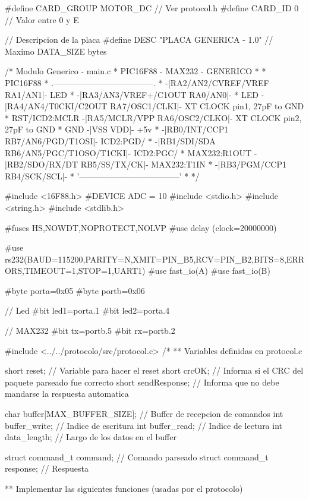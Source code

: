 \documentclass[a4paper,10pt]{article}
\begin{document}
{\scriptsize
\begin{verbatimtab}
#define CARD_GROUP	MOTOR_DC	// Ver protocol.h
#define CARD_ID		0		// Valor entre 0 y E

// Descripcion de la placa
#define DESC		"PLACA GENERICA - 1.0" // Maximo DATA_SIZE bytes

/* Modulo Generico - main.c
 * PIC16F88 - MAX232 - GENERICO
 *
 *                               PIC16F88
 *                .------------------------------------.
 *               -|RA2/AN2/CVREF/VREF           RA1/AN1|- LED
 *               -|RA3/AN3/VREF+/C1OUT          RA0/AN0|- 
 *           LED -|RA4/AN4/T0CKI/C2OUT    RA7/OSC1/CLKI|- XT CLOCK pin1, 27pF to GND
 * RST/ICD2:MCLR -|RA5/MCLR/VPP           RA6/OSC2/CLKO|- XT CLOCK pin2, 27pF to GND
 *           GND -|VSS                              VDD|- +5v
 *               -|RB0/INT/CCP1       RB7/AN6/PGD/T1OSI|- ICD2:PGD/
 *               -|RB1/SDI/SDA  RB6/AN5/PGC/T1OSO/T1CKI|- ICD2:PGC/
 *  MAX232:R1OUT -|RB2/SDO/RX/DT           RB5/SS/TX/CK|- MAX232:T1IN
 *               -|RB3/PGM/CCP1             RB4/SCK/SCL|- 
 *                '------------------------------------'
 *    
 */

#include <16F88.h>
#DEVICE ADC = 10
#include <stdio.h>
#include <string.h>
#include <stdlib.h>

#fuses HS,NOWDT,NOPROTECT,NOLVP
#use delay (clock=20000000)

#use rs232(BAUD=115200,PARITY=N,XMIT=PIN_B5,RCV=PIN_B2,BITS=8,ERRORS,TIMEOUT=1,STOP=1,UART1)
#use fast_io(A)
#use fast_io(B)

#byte porta=0x05
#byte portb=0x06

// Led
#bit led1=porta.1
#bit led2=porta.4

// MAX232
#bit tx=portb.5
#bit rx=portb.2

#include <../../protocolo/src/protocol.c>
/*
** Variables definidas en protocol.c

short reset; // Variable para hacer el reset
short crcOK; // Informa si el CRC del paquete parseado fue correcto
short sendResponse; // Informa que no debe mandarse la respuesta automatica

char buffer[MAX_BUFFER_SIZE];	// Buffer de recepcion de comandos
int buffer_write;		// Indice de escritura
int buffer_read;		// Indice de lectura
int data_length;		// Largo de los datos en el buffer

struct command_t command; 	// Comando parseado
struct command_t response; 	// Respuesta

** Implementar las siguientes funciones (usadas por el protocolo)


\end{verbatimtab}}
\end{document}
